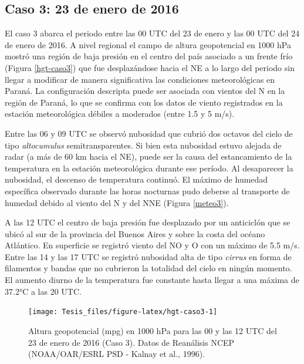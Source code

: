 \documentclass[12pt,spanish,oneside, a4paper]{book}
\begin{document}
\subsection{Caso 3: 23 de enero de
2016}\label{caso-3-23-de-enero-de-2016}

El caso 3 abarca el periodo entre las 00 UTC del 23 de enero y las 00
UTC del 24 de enero de 2016. A nivel regional el campo de altura
geopotencial en 1000 hPa mostró una región de baja presión en el centro
del país asociado a un frente frío (Figura \ref{hgt-caso3}) que fue
desplazándose hacia el NE a lo largo del periodo sin llegar a modificar
de manera significativa las condiciones meteorológicas en Paraná. La
configuración descripta puede ser asociada con vientos del N en la
región de Paraná, lo que se confirma con los datos de viento registrados
en la estación meteorológica débiles a moderados (entre 1.5 y 5 m/s).

Entre las 06 y 09 UTC se observó nubosidad que cubrió dos octavos del
cielo de tipo \emph{altocumulus} semitransparentes. Si bien esta
nubosidad estuvo alejada de radar (a más de 60 km hacia el NE), puede
ser la causa del estancamiento de la temperatura en la estación
meteorológica durante ese período. Al desaparecer la nubosidad, el
descenso de temperatura continuó. El máximo de humedad específica
observado durante las horas nocturnas pudo deberse al transporte de
humedad debido al viento del N y del NNE (Figura \ref{meteo3}).

A las 12 UTC el centro de baja presión fue desplazado por un anticiclón
que se ubicó al sur de la provincia del Buenos Aires y sobre la costa
del océano Atlántico. En superficie se registró viento del NO y O con un
máximo de 5.5 m/s. Entre las 14 y las 17 UTC se registró nubosidad alta
de tipo \emph{cirrus} en forma de filamentos y bandas que no cubrieron
la totalidad del cielo en ningún momento. El aumento diurno de la
temperatura fue constante hasta llegar a una máxima de 37.2°C a las 20
UTC.

\begin{figure}

{\centering \texttt{[image: Tesis\_files/figure-latex/hgt-caso3-1]} 

}

\caption{Altura geopotencial (mpg) en 1000 hPa para las 00 y las 12 UTC del 23 de enero de 2016 (Caso 3). Datos de Reanálisis NCEP (NOAA/OAR/ESRL PSD - Kalnay et al., 1996). \label{hgt-caso3}}\label{fig:hgt-caso3}
\end{figure}
\end{document}
